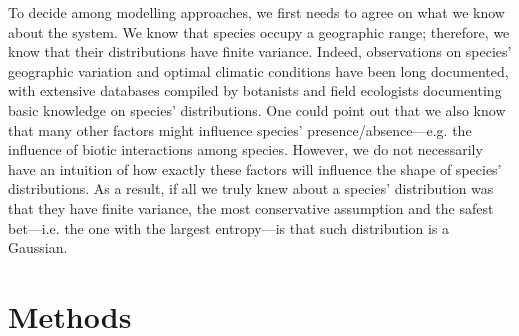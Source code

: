 \documentclass[11pt, a4paper]{article}
\begin{document}
To decide among modelling approaches, we first needs to agree on what we know about the system. We know that species occupy a geographic range; therefore, we know that their distributions have finite variance. Indeed, observations on species' geographic variation and optimal climatic conditions have been long documented, with extensive databases compiled by botanists and field ecologists documenting basic knowledge on species' distributions. One could point out that we also know that many other factors might influence species' presence/absence---e.g. the influence of biotic interactions among species. However, we do not necessarily have an intuition of how exactly these factors will influence the shape of species' distributions. As a result, if all we truly knew about a species' distribution was that they have finite variance, the most conservative assumption and the safest bet---i.e. the one with the largest entropy---is that such distribution is a Gaussian.





\section*{Methods}
\end{document}
